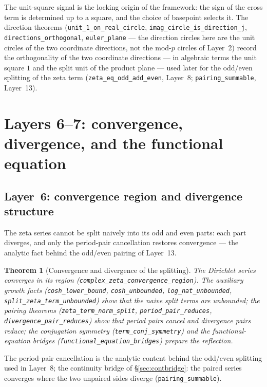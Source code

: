 \documentclass{article}
\newtheorem{theorem}{Theorem}[section]
\begin{document}
The unit-square signal is the locking origin of the framework: the
sign of the cross term is determined up to a square, and the choice of
basepoint selects it. The direction theorems
(\texttt{unit\_1\_on\_real\_circle}, \texttt{imag\_circle\_is\_direction\_j},
\texttt{directions\_orthogonal}, \texttt{euler\_plane} --- the
direction circles here are the unit circles of the two coordinate
directions, not the mod-$p$ circles of Layer~2) record the
orthogonality of the two coordinate directions --- in algebraic terms
the unit square $1$ and the split unit of the product plane --- used
later for the odd/even splitting of
the zeta term (\texttt{zeta\_eq\_odd\_add\_even}, Layer~8;
\texttt{pairing\_summable}, Layer~13).

\section{Layers 6--7: convergence, divergence, and the functional equation}
\label{sec:L6}

\subsection{Layer~6: convergence region and divergence structure}
\label{sec:L6a}

The zeta series cannot be split naively into its odd and even parts:
each part diverges, and only the period-pair cancellation restores
convergence --- the analytic fact behind the odd/even pairing of
Layer~13.

\begin{theorem}[Convergence and divergence of the splitting]
\label{thm:divergence}
The Dirichlet series converges in its region
(\texttt{complex\_zeta\_convergence\_region}). The auxiliary growth facts
(\texttt{cosh\_lower\_bound}, \texttt{cosh\_unbounded},
\texttt{log\_nat\_unbounded}, \texttt{split\_zeta\_term\_unbounded}) show
that the naive split terms are unbounded; the pairing theorems
(\texttt{zeta\_term\_norm\_split}, \texttt{period\_pair\_reduces},
\texttt{divergence\_pair\_reduces}) show that period pairs cancel and
divergence pairs reduce; the conjugation symmetry
(\texttt{term\_conj\_symmetry}) and the functional-equation bridges
(\texttt{functional\_equation\_bridges}) prepare the reflection.
\end{theorem}

The period-pair cancellation is the analytic content behind the
odd/even splitting used in Layer~8; the continuity bridge of
\S\ref{sec:contbridge}: the paired series converges
where the two unpaired sides diverge (\texttt{pairing\_summable}).
\end{document}
